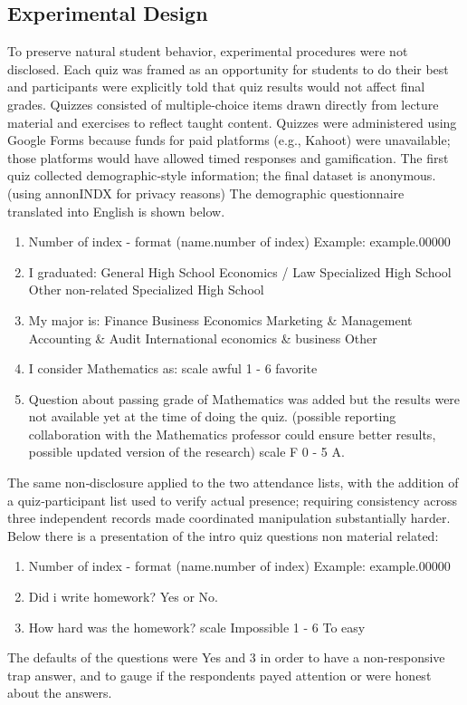 \documentclass[]{article}
\begin{document}
	\newpage
	
	\subsection{Experimental Design}
	
	To preserve natural student behavior, experimental procedures were not disclosed. Each quiz was framed as an opportunity for students to do their best and participants were explicitly told that quiz results would not affect final grades. Quizzes consisted of multiple‑choice items drawn directly from lecture material and exercises to reflect taught content. Quizzes were administered using Google Forms because funds for paid platforms (e.g., Kahoot) were unavailable; those platforms would have allowed timed responses and gamification. The first quiz collected demographic‑style information; the final dataset is anonymous. (using annonINDX for privacy reasons) The demographic questionnaire translated into English is shown below. \\
	\begin{enumerate}
		\item Number of index - format (name.number of index) Example: example.00000
		\item I graduated:
		\subitem General High School
		\subitem Economics / Law Specialized High School
		\subitem Other non-related Specialized High School
		\item My major is:
		\subitem Finance
		\subitem Business Economics
		\subitem Marketing \& Management
		\subitem Accounting \& Audit
		\subitem International economics \& business
		\subitem Other
		\item I consider Mathematics as:
		\subitem scale awful 1 - 6 favorite
		\item Question about passing grade of Mathematics was added but the results were not available yet at the time of doing the quiz. (possible reporting collaboration with the Mathematics professor could ensure better results, possible updated version of the research)
		\subitem scale F 0 - 5 A.
	\end{enumerate}

	
	The same non‑disclosure applied to the two attendance lists, with the addition of a quiz‑participant list used to verify actual presence; requiring consistency across three independent records made coordinated manipulation substantially harder. Below there is a presentation of the intro quiz questions non material related:
	
	\begin{enumerate}
		\item Number of index - format (name.number of index) Example: example.00000
		\item Did i write homework?
		\subitem Yes or No.
		\item How hard was the homework? 
		\subitem scale Impossible 1 - 6 To easy
	\end{enumerate}
	The defaults of the questions were Yes and 3 in order to have a non-responsive trap answer, and to gauge if the respondents payed attention or were honest about the answers.
	
\end{document}
